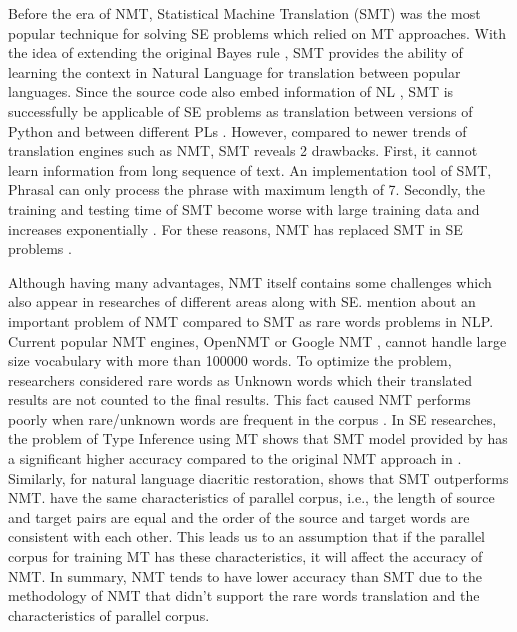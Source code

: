 Before the era of NMT, Statistical Machine Translation (SMT) \cite{016} was the most popular technique for solving SE problems which relied on MT approaches. With the idea of extending the original Bayes rule \cite{017}, SMT provides the ability of learning the context in Natural Language for translation between popular languages. Since the source code also embed information of NL \cite{018}, SMT is successfully be applicable of SE problems as translation between versions of Python \cite{019} and between different PLs \cite{020}. However, compared to newer trends of translation engines such as NMT, SMT reveals 2 drawbacks. First, it cannot learn information from long sequence of text. An implementation tool of SMT, Phrasal \cite{021} can only process the phrase with maximum length of 7. Secondly, the training and testing time of SMT become worse with large training data and increases exponentially \cite{022}. For these reasons, NMT has replaced SMT in SE problems \cite{010,011}.

Although having many advantages, NMT itself contains some challenges which also appear in researches of different areas along with SE. \cite{024,023} mention about an important problem of NMT compared to SMT as rare words problems in NLP. Current popular NMT engines, OpenNMT \cite{025} or Google NMT \cite{026}, cannot handle large size vocabulary with more than 100000 words. To optimize the problem, researchers considered rare words as Unknown words which their translated results are not counted to the final results. This fact caused NMT performs poorly when rare/unknown words are frequent in the corpus \cite{024}. In SE researches, the problem of Type Inference using MT shows that SMT model provided by \cite{028} has a significant higher accuracy compared to the original NMT approach in \cite{027}. Similarly, for natural language diacritic restoration, \cite{029} shows that SMT outperforms NMT.  \cite{026,027,028} have the same characteristics of parallel corpus, i.e., the length of source and target pairs are equal and the order of the source and target words are consistent with each other. This leads us to an assumption that if the parallel corpus for training MT has these characteristics, it will affect the accuracy of NMT. In summary, NMT tends to have lower accuracy than SMT due to the methodology of NMT that didn't support the rare words translation and the characteristics of parallel corpus. 


